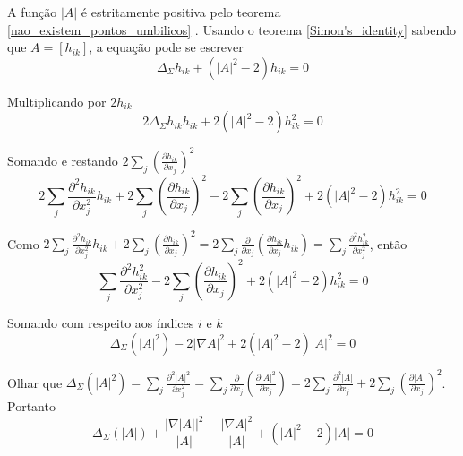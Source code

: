 \begin{demonstracao}
	A função $|A|$ é estritamente positiva pelo teorema \ref{nao_existem_pontos_umbilicos} . Usando o  teorema \ref{Simon's_identity} sabendo que $A = [h_{ik}]$, a equação pode se escrever
	\begin{equation*}
		\Delta_{\Sigma} h_{ik} + (|A|^2 - 2)h_{ik} = 0
	\end{equation*}
	
	Multiplicando por $2 h_{ik}$
	\begin{equation*}
		2 \Delta_{\Sigma} h_{ik} h_{ik} + 2 (|A|^2 - 2)h_{ik}^2 = 0
	\end{equation*}
	
	Somando e restando $ 2 \sum_j \left( \frac{\partial h_{ik}}{\partial x_j} \right)^2 $
	\begin{equation*}
		2 \sum_j \frac{\partial^2 h_{ik}}{\partial x_j^2} h_{ik} + 2 \sum_j \left( \frac{\partial h_{ik}}{\partial x_j} \right)^2 - 2 \sum_j \left( \frac{\partial h_{ik}}{\partial x_j} \right)^2 + 2 (|A|^2 - 2)h_{ik}^2 = 0
	\end{equation*}
	
	Como $ 2 \sum_j \frac{\partial^2 h_{ik}}{\partial x_j^2} h_{ik} + 2 \sum_j \left( \frac{\partial h_{ik}}{\partial x_j} \right)^2 = 2 \sum_j \frac{\partial }{\partial x_j} \left( \frac{\partial h_{ik}}{\partial x_j} h_{ik} \right) = \sum_j \frac{\partial^2 h_{ik}^2}{\partial x_j^2} $, então
	\begin{equation*}
		\sum_j \frac{\partial^2 h_{ik}^2}{\partial x_j^2} - 2 \sum_j \left( \frac{\partial h_{ik}}{\partial x_j} \right)^2 + 2 (|A|^2 - 2)h_{ik}^2 = 0
	\end{equation*}
	
	Somando com respeito aos índices $i$ e $k$
	\begin{equation*}
	\Delta_{\Sigma} (|A|^2) - 2 | \nabla A |^2 + 2 (|A|^2 - 2) |A|^2 = 0
	\end{equation*}
	
	Olhar que $ \Delta_{\Sigma} (|A|^2) = \sum_j \frac{\partial^2 |A|^2}{\partial x_j^2} = \sum_j \frac{\partial}{\partial x_j} \left( \frac{\partial |A|^2}{\partial x_j} \right) = 2 \sum_j \frac{\partial^2 |A|}{\partial x_j} + 2 \sum_j \left( \frac{\partial |A|}{\partial x_j} \right)^2 $. Portanto
	\begin{equation}\label{edp_sff}
		\Delta_{\Sigma} (|A|) + \frac{|\nabla |A||^2}{|A|} - \frac{|\nabla A|^2}{|A|} + (|A|^2 - 2) |A| = 0
	\end{equation}
	

\end{demonstracao}
